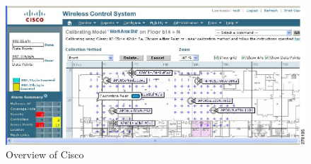 \begin{figure}[ht]
	\begin{center}
	\includegraphics[scale=1]{graphics/cisco_overview.png}
	\caption{Overview of Cisco\cite{cisco_overview}}
	\label{fig:cisco_overveiw}
	\end{center}
\end{figure}


